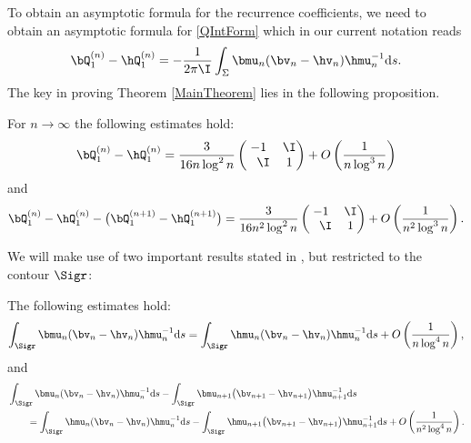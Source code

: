 To obtain an asymptotic formula for the recurrence coefficients, we need to obtain an asymptotic formula for \eqref{QIntForm} which in our current notation reads
\begin{align}\label{QQ1}
 \bQ_1^{(n)} - \hQ_1^{(n)} = - \frac{1}{2\pi\I} \int_\Sigma \bmu_n(\bv_n-\hv_n)\hmu^{-1}_n {\rm d}s.
\end{align}
The key in proving Theorem \ref{MainTheorem} lies in the following proposition.
\begin{Proposition}\label{QQ}
For $n \to \infty$ the following estimates hold:
\begin{align*}
 \bQ_1^{(n)} - \hQ_1^{(n)} = \frac{3}{16n \log^2n} \begin{pmatrix}
-1 & \I\\
\phantom{-}\I & 1
\end{pmatrix} + O\left(\frac{1}{n\log^3 n}\right)
\end{align*}
and
\begin{align} \label{QDiffFormula2}
 \bQ_1^{(n)} - \hQ_1^{(n)} - \big(\bQ_1^{(n+1)} - \hQ_1^{(n+1)}\big) = \frac{3}{16n^2 \log^2n} \begin{pmatrix}
-1 & \I\\
\phantom{-}\I & 1
\end{pmatrix} + O\left(\frac{1}{n^2\log^3 n}\right).
\end{align}
\end{Proposition}
We will make use of two important results stated in \cite[Section~5.2]{CD}, but restricted to the contour $\Sigr$:
\begin{Proposition}\label{IntegralEst1}
The following estimates hold:
\begin{align}\label{LegendreSubstitution1}
 \int_{\Sigr} \bmu_n(\bv_n-\hv_n)\hmu_n^{-1} {\rm d}s = \int_{\Sigr} \hmu_n(\bv_n-\hv_n)\hmu_n^{-1} {\rm d}s + O\left(\frac{1}{n\log^4 n}\right),
\end{align}
and
\begin{align}
 & \int_{\Sigr} \bmu_n(\bv_n-\hv_n)\hmu^{-1}_n {\rm d}s - \int_{\Sigr} \bmu_{n+1}\big(\bv_{n+1}-\hv_{n+1}\big)\hmu^{-1}_{n+1} {\rm d}s
\nonumber \\
 &\qquad=\int_{\Sigr} \hmu_n(\bv_n-\hv_n)\hmu^{-1}_n {\rm d}s - \int_{\Sigr} \hmu_{n+1}\big(\bv_{n+1}-\hv_{n+1}\big)\hmu^{-1}_{n+1} {\rm d}s + O\left(\frac{1}{n^2\log^4 n}\right).\label{LegendreSubstitution2}
\end{align}
\end{Proposition}
